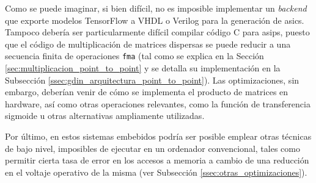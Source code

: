 Como se puede imaginar, si bien difícil, no es imposible implementar un \textit{backend} que exporte modelos TensorFlow a VHDL o Verilog para la generación de \acrshort{asic}s. Tampoco debería ser particularmente difícil compilar código C para \acrshort{asip}s, puesto que el código de multiplicación de matrices dispersas se puede reducir a una secuencia finita de operaciones \texttt{\acrshort{fma}} (tal como se explica en la Sección \ref{sec:multiplicacion_point_to_point} y se detalla su implementación en la Subsección \ref{ssec:gdin_arquitectura_point_to_point}). Las optimizaciones, sin embargo, deberían venir de cómo se implementa el producto de matrices en hardware, así como otras operaciones relevantes, como la función de transferencia sigmoide u otras alternativas ampliamente utilizadas.

Por último, en estos sistemas embebidos podría ser posible emplear otras técnicas de bajo nivel, imposibles de ejecutar en un ordenador convencional, tales como permitir cierta tasa de error en los accesos a memoria a cambio de una reducción en el voltaje operativo de la misma (ver Subsección \ref{ssec:otras_optimizaciones}).
